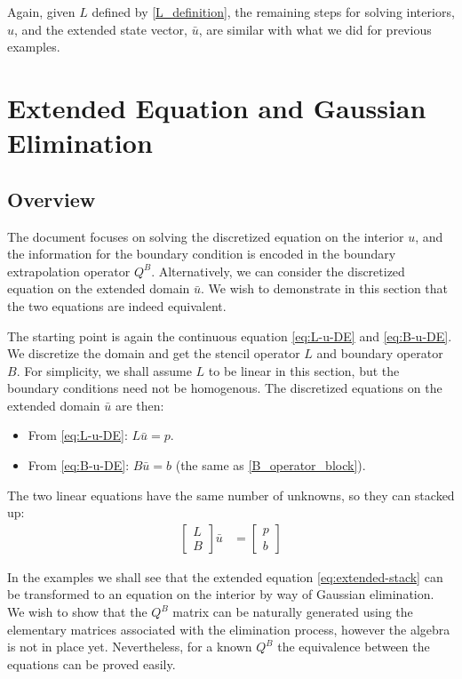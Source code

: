 \documentclass[11pt]{article}
\begin{document}
Again, given $L$ defined by \cref{L_definition}, the remaining steps for solving interiors, $u$, and the extended state vector, $\bar{u}$, are similar with what we did for previous examples.

\appendix
\section{Extended Equation and Gaussian Elimination}
\subsection{Overview}
The document focuses on solving the discretized equation on the interior $u$, and the information for the boundary condition is encoded in the boundary extrapolation operator $Q^B$. Alternatively, we can consider the discretized equation on the extended domain $\bar{u}$. We wish to demonstrate in this section that the two equations are indeed equivalent.

The starting point is again the continuous equation \cref{eq:L-u-DE} and \cref{eq:B-u-DE}. We discretize the domain and get the stencil operator $L$ and boundary operator $B$. For simplicity, we shall assume $L$ to be linear in this section, but the boundary conditions need not be homogenous. The discretized equations on the extended domain $\bar{u}$ are then:
\begin{itemize}
	\item From \cref{eq:L-u-DE}: $L\bar{u} = p$.
	\item From \cref{eq:B-u-DE}: $B\bar{u} = b$ (the same as \cref{B_operator_block}).
\end{itemize}

The two linear equations have the same number of unknowns, so they can stacked up:
\begin{align}
	\begin{bmatrix} L \\ B \end{bmatrix} \bar{u} &=
	\begin{bmatrix} p \\ b \end{bmatrix}\label{eq:extended-stack}
\end{align}

In the examples we shall see that the extended equation \cref{eq:extended-stack} can be transformed to an equation on the interior by way of Gaussian elimination. We wish to show that the $Q^B$ matrix can be naturally generated using the elementary matrices associated with the elimination process, however the algebra is not in place yet. Nevertheless, for a known $Q^B$ the equivalence between the equations can be proved easily.
\end{document}
